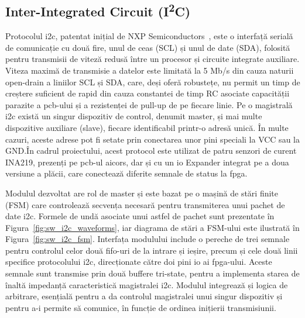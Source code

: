 \documentclass[12pt,a4paper]{report}
\begin{document}
\subsection[Inter-Integrated Circuit (I2C)]{Inter-Integrated Circuit (I\textsuperscript{2}C)}
Protocolul \gls{i2c}, patentat inițial de NXP Semiconductors~\cite{patent_i2c}, este o interfață serială de comunicație cu două fire, unul de ceas (SCL) și unul de date (SDA), folosită pentru transmisii de viteză redusă între un procesor și circuite integrate auxiliare. Viteza maximă de transmisie a datelor este limitată la 5 Mb/s din cauza naturii open-drain a liniilor SCL și SDA, care, deși oferă robustețe, nu permit un timp de creștere suficient de rapid din cauza constantei de timp RC asociate capacității parazite a \gls{pcb}-ului și a rezistenței de pull-up de pe fiecare linie. Pe o magistrală \gls{i2c} există un singur dispozitiv de control, denumit master, și mai multe dispozitive auxiliare (slave), fiecare identificabil printr-o adresă unică. În multe cazuri, aceste adrese pot fi setate prin conectarea unor pini speciali la VCC sau la GND.\@ În cadrul proiectului, acest protocol este utilizat de patru senzori de curent INA219, prezenți pe \gls{pcb}-ul \gls{aicors}, dar și cu un \gls{io} Expander integrat pe a doua versiune a plăcii, care conectează diferite semnale de status la \gls{fpga}.

Modulul dezvoltat are rol de master și este bazat pe o mașină de stări finite (FSM) care controlează secvența necesară pentru transmiterea unui pachet de date \gls{i2c}. Formele de undă asociate unui astfel de pachet sunt prezentate în Figura~\ref{fig:sw_i2c_waveforms}, iar diagrama de stări a FSM-ului este ilustrată în Figura~\ref{fig:sw_i2c_fsm}. Interfața modulului include o pereche de trei semnale pentru controlul celor două \gls{fifo}-uri de la intrare și ieșire, precum și cele două linii specifice protocolului \gls{i2c}, direcționate către doi pini \gls{io} ai \gls{fpga}-ului. Aceste semnale sunt transmise prin două buffere tri-state, pentru a implementa starea de înaltă impedanță caracteristică magistralei \gls{i2c}. Modulul integrează și logica de arbitrare, esențială pentru a da controlul magistralei unui singur dispozitiv și pentru a-i permite să comunice, în funcție de ordinea inițierii transmisiunii.
\end{document}
